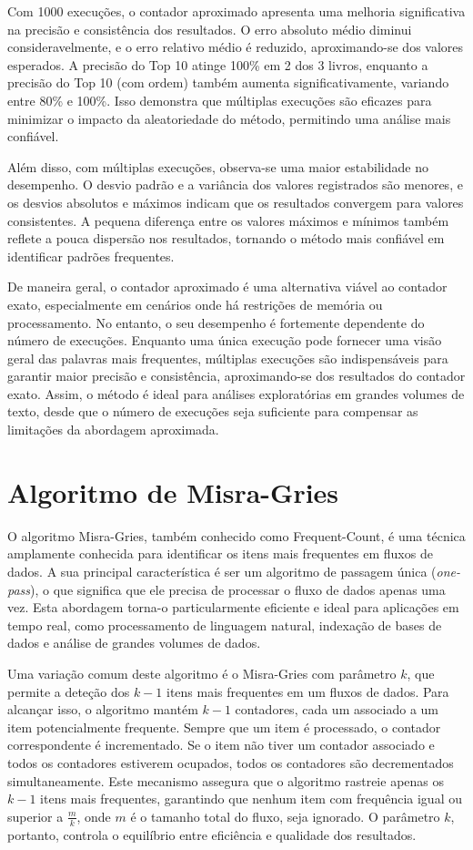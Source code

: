 \documentclass[shortpaper, portugues, times, mirror]{revdetua}
\begin{document}
Com 1000 execuções, o contador aproximado apresenta uma melhoria significativa na precisão e consistência dos resultados. O erro absoluto médio diminui consideravelmente, e o erro relativo médio é reduzido, aproximando-se dos valores esperados. A precisão do Top 10 atinge 100\% em 2 dos 3 livros, enquanto a precisão do Top 10 (com ordem) também aumenta significativamente, variando entre 80\% e 100\%. Isso demonstra que múltiplas execuções são eficazes para minimizar o impacto da aleatoriedade do método, permitindo uma análise mais confiável.

Além disso, com múltiplas execuções, observa-se uma maior estabilidade no desempenho. O desvio padrão e a variância dos valores registrados são menores, e os desvios absolutos e máximos indicam que os resultados convergem para valores consistentes. A pequena diferença entre os valores máximos e mínimos também reflete a pouca dispersão nos resultados, tornando o método mais confiável em identificar padrões frequentes.

De maneira geral, o contador aproximado é uma alternativa viável ao contador exato, especialmente em cenários onde há restrições de memória ou processamento. No entanto, o seu desempenho é fortemente dependente do número de execuções. Enquanto uma única execução pode fornecer uma visão geral das palavras mais frequentes, múltiplas execuções são indispensáveis para garantir maior precisão e consistência, aproximando-se dos resultados do contador exato. Assim, o método é ideal para análises exploratórias em grandes volumes de texto, desde que o número de execuções seja suficiente para compensar as limitações da abordagem aproximada.

\section{Algoritmo de Misra-Gries}

O algoritmo Misra-Gries, também conhecido como Frequent-Count, é uma técnica amplamente conhecida para identificar os itens mais frequentes em fluxos de dados. A sua principal característica é ser um algoritmo de passagem única (\textit{one-pass}), o que significa que ele precisa de processar o fluxo de dados apenas uma vez. Esta abordagem torna-o particularmente eficiente e ideal para aplicações em tempo real, como processamento de linguagem natural, indexação de bases de dados e análise de grandes volumes de dados.

Uma variação comum deste algoritmo é o Misra-Gries com parâmetro \(k\), que permite a deteção dos \(k-1\) itens mais frequentes em um fluxos de dados. Para alcançar isso, o algoritmo mantém \(k-1\) contadores, cada um associado a um item potencialmente frequente. Sempre que um item é processado, o contador correspondente é incrementado. Se o item não tiver um contador associado e todos os contadores estiverem ocupados, todos os contadores são decrementados simultaneamente. Este mecanismo assegura que o algoritmo rastreie apenas os \(k-1\) itens mais frequentes, garantindo que nenhum item com frequência igual ou superior a \(\frac{m}{k}\), onde \(m\) é o tamanho total do fluxo, seja ignorado. O parâmetro \(k\), portanto, controla o equilíbrio entre eficiência e qualidade dos resultados.
\end{document}

